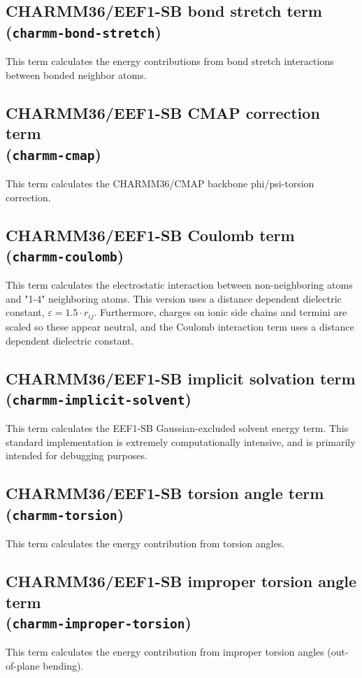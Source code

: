 \subsection{CHARMM36/EEF1-SB bond stretch term\\(\texttt{charmm-bond-stretch})}
This term calculates the energy contributions from bond stretch interactions between bonded neighbor atoms.

\subsection{CHARMM36/EEF1-SB CMAP correction term\\(\texttt{charmm-cmap})}
This term calculates the CHARMM36/CMAP backbone phi/psi-torsion correction.


\subsection{CHARMM36/EEF1-SB Coulomb term\\(\texttt{charmm-coulomb})}
This term calculates the electrostatic interaction between non-neighboring atoms and "1-4" neighboring atoms. 
This version uses a distance dependent dielectric constant, $\varepsilon = 1.5 \cdot r_{ij}$.
Furthermore, charges on ionic side chains and termini are scaled so these appear neutral, and the Coulomb interaction term uses a distance dependent dielectric constant.


\subsection{CHARMM36/EEF1-SB implicit solvation term\\(\texttt{charmm-implicit-solvent})}
This term calculates the EEF1-SB Gaussian-excluded solvent energy term.
This standard implementation is extremely computationally intensive,
and is primarily intended for debugging purposes.


\subsection{CHARMM36/EEF1-SB torsion angle term\\(\texttt{charmm-torsion})}
This term calculates the energy contribution from torsion angles.


\subsection{CHARMM36/EEF1-SB improper torsion angle term\\(\texttt{charmm-improper-torsion})}
This term calculates the energy contribution from improper torsion angles (out-of-plane bending).


